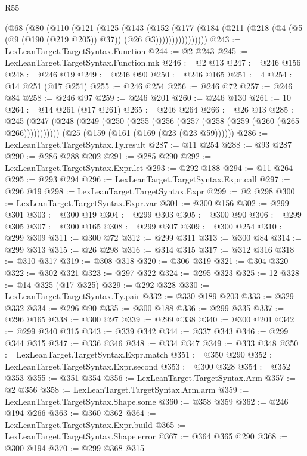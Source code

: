\begin{lexlean}{R55}
\begin{coremodule}
          (@68
            (@80
              (@110
                (@121
                  (@125
                    (@143
                      (@152
                        (@177
                          (@184
                            (@211 (@218 (@4 (@5 (@9 (@190 (@219 @205)) @37)) (@26 @3))))))))))))))))
@243 := LexLeanTarget.TargetSyntax.Function
@244 := @2 @243
@245 := LexLeanTarget.TargetSyntax.Function.mk
@246 := @2 @13
@247 := @246 @156
@248 := @246 @19
@249 := @246 @90
@250 := @246 @165
@251 := 4
@254 := @14 @251 (@17 @251)
@255 := @246 @254
@256 := @246 @72
@257 := @246 @84
@258 := @246 @97
@259 := @246 @201
@260 := @246 @130
@261 := 10
@264 := @14 @261 (@17 @261)
@265 := @246 @264
@266 := @26 @13
@285 := @245
    (@247 (@248 (@249 (@250 (@255 (@256 (@257 (@258 (@259 (@260 (@265 @266)))))))))))
    (@25 (@159 (@161 (@169 (@23 (@23 @59))))))
@286 := LexLeanTarget.TargetSyntax.Ty.result
@287 := @11 @254
@288 := @93 @287
@290 := @286 @288 @202
@291 := @285 @290
@292 := LexLeanTarget.TargetSyntax.Expr.let
@293 := @292 @188
@294 := @11 @264
@295 := @293 @294
@296 := LexLeanTarget.TargetSyntax.Expr.call
@297 := @296 @19
@298 := LexLeanTarget.TargetSyntax.Expr
@299 := @2 @298
@300 := LexLeanTarget.TargetSyntax.Expr.var
@301 := @300 @156
@302 := @299 @301
@303 := @300 @19
@304 := @299 @303
@305 := @300 @90
@306 := @299 @305
@307 := @300 @165
@308 := @299 @307
@309 := @300 @254
@310 := @299 @309
@311 := @300 @72
@312 := @299 @311
@313 := @300 @84
@314 := @299 @313
@315 := @26 @298
@316 := @314 @315
@317 := @312 @316
@318 := @310 @317
@319 := @308 @318
@320 := @306 @319
@321 := @304 @320
@322 := @302 @321
@323 := @297 @322
@324 := @295 @323
@325 := 12
@328 := @14 @325 (@17 @325)
@329 := @292 @328
@330 := LexLeanTarget.TargetSyntax.Ty.pair
@332 := @330 @189 @203
@333 := @329 @332
@334 := @296 @90
@335 := @300 @188
@336 := @299 @335
@337 := @296 @165
@338 := @300 @97
@339 := @299 @338
@340 := @300 @201
@342 := @299 @340 @315
@343 := @339 @342
@344 := @337 @343
@346 := @299 @344 @315
@347 := @336 @346
@348 := @334 @347
@349 := @333 @348
@350 := LexLeanTarget.TargetSyntax.Expr.match
@351 := @350 @290
@352 := LexLeanTarget.TargetSyntax.Expr.second
@353 := @300 @328
@354 := @352 @353
@355 := @351 @354
@356 := LexLeanTarget.TargetSyntax.Arm
@357 := @2 @356
@358 := LexLeanTarget.TargetSyntax.Arm.arm
@359 := LexLeanTarget.TargetSyntax.Shape.some
@360 := @358 @359
@362 := @246 @194 @266
@363 := @360 @362
@364 := LexLeanTarget.TargetSyntax.Expr.build
@365 := LexLeanTarget.TargetSyntax.Shape.error
@367 := @364 @365 @290
@368 := @300 @194
@370 := @299 @368 @315

\end{coremodule}
\end{lexlean}
